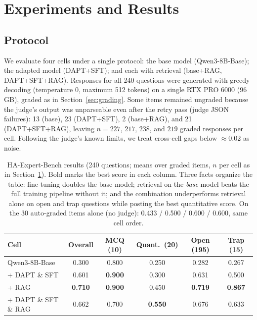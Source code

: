 \documentclass[11pt]{article}
\begin{document}
\section{Experiments and Results}
\label{sec:experiments}

\subsection{Protocol}

We evaluate four cells under a single protocol: the base model
(Qwen3-8B-Base); the adapted model (DAPT+SFT); and each with
retrieval (base+RAG, DAPT+SFT+RAG). Responses for all 240 questions were
generated with greedy decoding (temperature 0, maximum 512 tokens) on a
single RTX PRO 6000 (96\,GB), graded as in
Section~\ref{sec:grading}. Some items remained ungraded because the judge's output was
unparseable even after the retry pass (judge JSON failures): 13 (base),
23 (DAPT+SFT), 2 (base+RAG), and 21 (DAPT+SFT+RAG),
leaving $n = 227$, $217$, $238$, and $219$ graded responses per cell.
Following the judge's known limits, we treat cross-cell gaps
below $\approx$0.02 as noise.

\begin{table}[t]
\centering
\begin{tabular}{lccccc}
\toprule
Cell & Overall & MCQ (10) & Quant.\ (20) & Open (195) & Trap (15) \\
\midrule
Qwen3-8B-Base        & 0.300 & 0.800 & 0.250 & 0.282 & 0.267 \\
+ DAPT \& SFT        & 0.601 & \textbf{0.900} & 0.300 & 0.631 & 0.500 \\
+ RAG                & \textbf{0.710} & \textbf{0.900} & 0.450 & \textbf{0.719} & \textbf{0.867} \\
+ DAPT \& SFT \& RAG & 0.662 & 0.700 & \textbf{0.550} & 0.676 & 0.633 \\
\bottomrule
\end{tabular}
\caption{HA-Expert-Bench results (240 questions; means over graded items,
$n$ per cell as in Section~\ref{sec:experiments}). Bold marks the best
score in each column. Three facts organize the table: fine-tuning doubles
the base model; retrieval on the \emph{base} model beats the full
training pipeline without it; and the combination underperforms
retrieval alone on open and trap questions while posting the best
quantitative score. On the 30 auto-graded items alone (no judge):
0.433 / 0.500 / 0.600 / 0.600, same cell order.}
\label{tab:main}
\end{table}
\end{document}
